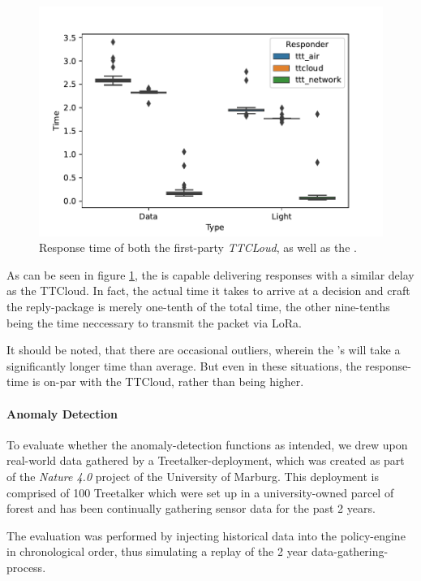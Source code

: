 \begin{figure}
    \centering
    \includegraphics[width=\linewidth]{figures/response_times.pdf}
    \caption{Response time of both the first-party \textit{TTCLoud}, as well as the \textit{\ttt}.}
    \label{fig:evaluation:ttt_response}
\end{figure}

As can be seen in figure \ref{fig:evaluation:ttt_response}, the \ttt is capable delivering responses with a similar delay as the TTCloud.
In fact, the actual time it takes to arrive at a decision and craft the reply-package is merely one-tenth of the total time, the other nine-tenths being the time neccessary to transmit the packet via LoRa.

It should be noted, that there are occasional outliers, wherein the {\ttt}'s will take a significantly longer time than average.
But even in these situations, the response-time is on-par with the TTCloud, rather than being higher.

\paragraph{Anomaly Detection}

To evaluate whether the anomaly-detection functions as intended, we drew upon real-world data gathered by a Treetalker-deployment, which was created as part of the \textit{Nature 4.0} project of the University of Marburg.
This deployment is comprised of 100 Treetalker which were set up in a university-owned parcel of forest and has been continually gathering sensor data for the past 2 years.

The evaluation was performed by injecting historical data into the policy-engine in chronological order, thus simulating a replay of the 2 year data-gathering-process.

